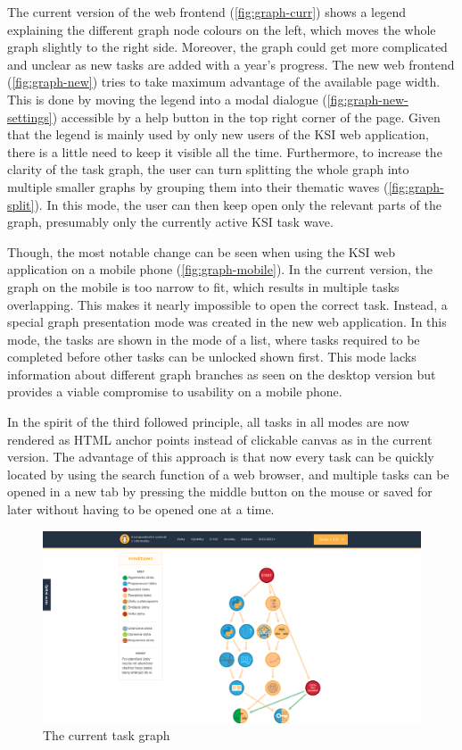 \documentclass[
  digital, %
  oneside, %
  lof,     %
  nolot,     %
]{fithesis4}
\begin{document}
{The current version of the web frontend (\autoref{fig:graph-curr}) shows a legend explaining the different graph node colours on the left, which moves the whole graph slightly to the right side. Moreover, the graph could get more complicated and unclear as new tasks are added with a year's progress. The new web frontend (\autoref{fig:graph-new}) tries to take maximum advantage of the available page width. This is done by moving the legend into a modal dialogue (\autoref{fig:graph-new-settings}) accessible by a help button in the top right corner of the page. Given that the legend is mainly used by only new users of the KSI web application, there is a little need to keep it visible all the time. Furthermore, to increase the clarity of the task graph, the user can turn splitting the whole graph into multiple smaller graphs by grouping them into their thematic waves (\autoref{fig:graph-split}). In this mode, the user can then keep open only the relevant parts of the graph, presumably only the currently active KSI task wave.

Though, the most notable change can be seen when using the KSI web application on a mobile phone (\autoref{fig:graph-mobile}). In the current version, the graph on the mobile is too narrow to fit, which results in multiple tasks overlapping. This makes it nearly impossible to open the correct task. Instead, a special graph presentation mode was created in the new web application. In this mode, the tasks are shown in the mode of a list, where tasks required to be completed before other tasks can be unlocked shown first. This mode lacks information about different graph branches as seen on the desktop version but provides a viable compromise to usability on a mobile phone.

In the spirit of the third followed principle, all tasks in all modes are now rendered as HTML anchor points instead of clickable canvas as in the current version. The advantage of this approach is that now every task can be quickly located by using the search function of a web browser, and multiple tasks can be opened in a new tab by pressing the middle button on the mouse or saved for later without having to be opened one at a time.

\begin{figure}
\includegraphics[width=\textwidth]{assets/img/graph_curr}
\caption{The current task graph}
\label{fig:graph-curr}
\end{figure}

}
\end{document}
